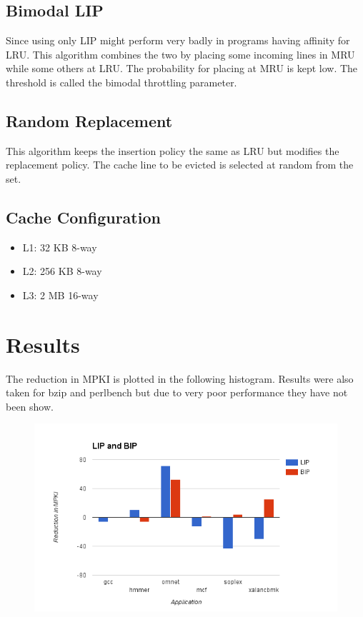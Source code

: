 \documentclass{article}
\begin{document}
\subsection{Bimodal LIP}
Since using only LIP might perform very badly in programs having affinity for LRU. This algorithm combines the two by placing some incoming lines in MRU while some others at LRU. The probability for placing at MRU is kept low. The threshold is called the bimodal throttling parameter.

\subsection{Random Replacement}
This algorithm keeps the insertion policy the same as LRU but modifies the replacement policy. The cache line to be evicted is selected at random from the set.

\subsection{Cache Configuration}
\begin{itemize}
\item  L1: 32 KB 8-way
\item L2: 256 KB 8-way
\item  L3: 2 MB 16-way 
  \end{itemize}

  \section{Results}
  The reduction in MPKI is plotted in the following histogram. Results were also taken for bzip and perlbench but due to very poor performance they have not been show.
  \begin{figure}[h!]
    \centering
    \includegraphics[width=1\textwidth]{image.png}
    \end{figure}
\end{document}
